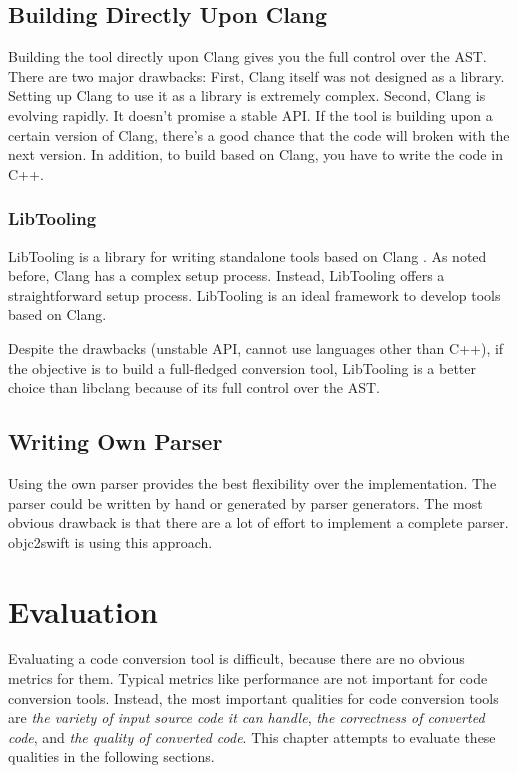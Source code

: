 \documentclass{sfuthesis}
\begin{document}
\section{Building Directly Upon Clang}

Building the tool directly upon Clang gives you the full control over the AST. There are two major drawbacks: First, Clang itself was not designed as a library. Setting up Clang to use it as a library is extremely complex. Second, Clang is evolving rapidly. It doesn't promise a stable API. If the tool is building upon a certain version of Clang, there's a good chance that the code will broken with the next version. In addition, to build based on Clang, you have to write the code in C++.

\subsection{LibTooling}

LibTooling is a library for writing standalone tools based on Clang \cite{libtooling}. As noted before, Clang has a complex setup process. Instead, LibTooling offers a straightforward setup process. LibTooling is an ideal framework to develop tools based on Clang.

Despite the drawbacks (unstable API, cannot use languages other than C++), if the objective is to build a full-fledged conversion tool, LibTooling is a better choice than libclang because of its full control over the AST.

\section{Writing Own Parser}

Using the own parser provides the best flexibility over the implementation. The parser could be written by hand or generated by parser generators. The most obvious drawback is that there are a lot of effort to implement a complete parser. objc2swift \cite{objc2swift} is using this approach.

\chapter{Evaluation}

Evaluating a code conversion tool is difficult, because there are no obvious metrics for them. Typical metrics like performance are not important for code conversion tools. Instead, the most important qualities for code conversion tools are \emph{the variety of input source code it can handle}, \emph{the correctness of converted code}, and \emph{the quality of converted code}. This chapter attempts to evaluate these qualities in the following sections.
\end{document}

